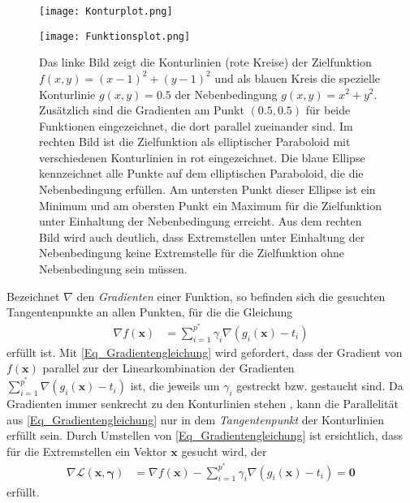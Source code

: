 \documentclass[12pt, a4paper]{report}\usepackage[]{graphicx}\usepackage[]{color}
\begin{document}
\begin{appendix}
\begin{figure}[ht]
 \begin{minipage}{0.5\linewidth}
  \centering
  \texttt{[image: Konturplot.png]}
 \end{minipage}%
 \begin{minipage}{0.5\linewidth}
  \centering
  \texttt{[image: Funktionsplot.png]}
 \end{minipage}
 \caption[Graphische Veranschaulichung einer Nebenbedingung]{Das linke Bild zeigt die Konturlinien (rote Kreise) der Zielfunktion $f(x,y)=(x-1)^2+(y-1)^2$ und als blauen Kreis die spezielle Konturlinie $g(x,y)=0.5$ der Nebenbedingung $g(x,y)=x^2+y^2$. Zusätzlich sind die Gradienten am Punkt $(0.5,0.5)$ für beide Funktionen eingezeichnet, die dort parallel zueinander sind. Im rechten Bild ist die Zielfunktion als elliptischer Paraboloid mit verschiedenen Konturlinien in rot eingezeichnet. Die blaue Ellipse kennzeichnet alle Punkte auf dem elliptischen Paraboloid, die die Nebenbedingung erfüllen. Am untersten Punkt dieser Ellipse ist ein Minimum und am obersten Punkt ein Maximum für die Zielfunktion unter Einhaltung der Nebenbedingung erreicht. Aus dem rechten Bild wird auch deutlich, dass Extremstellen unter Einhaltung der Nebenbedingung keine Extremstelle für die Zielfunktion ohne Nebenbedingung sein müssen.}
 \label{Fig:Lagrange_Geo_Interpret}
\end{figure} 
Bezeichnet $\nabla$ den \textit{Gradienten} einer Funktion, so befinden sich die gesuchten Tangentenpunkte an allen Punkten, für die die Gleichung
\begin{align}\label{Eq_Gradientengleichung}
\nabla f(\mathbf{x}) &= \sum_{i=1}^{p^*} \gamma_i \nabla  (g_i(\mathbf{x})-t_i)
\end{align}
erfüllt ist. Mit \eqref{Eq_Gradientengleichung} wird gefordert, dass der Gradient von $f(\mathbf{x})$ parallel zur der Linearkombination der Gradienten $\sum_{i=1}^{p^*} \nabla  (g_i(\mathbf{x})-t_i)$ ist, die jeweils um $\gamma_i$ gestreckt bzw. gestaucht sind. Da Gradienten immer senkrecht zu den Konturlinien stehen \cite{strang1991calculus}, kann die Parallelität aus \eqref{Eq_Gradientengleichung} nur in dem \textit{Tangentenpunkt} der Konturlinien erfüllt sein. Durch Umstellen von \eqref{Eq_Gradientengleichung} ist ersichtlich, dass für die Extremstellen ein Vektor $\mathbf{x}$ gesucht wird, der
\begin{align*}
\nabla \mathcal{L}(\mathbf{x},\boldsymbol{\gamma})&= \nabla f(\mathbf{x}) - \sum_{i=1}^{p^*} \gamma_i \nabla  (g_i(\mathbf{x})-t_i)=\mathbf{0}
\end{align*}
erfüllt.\\


\end{appendix}
\end{document}
